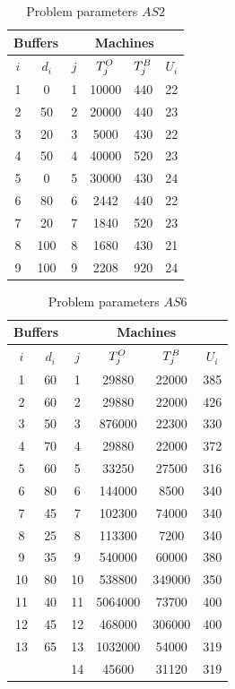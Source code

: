 \documentclass{ifacconf}
\begin{document}
\begin{table}[h!]
	\centering
	\small
	\begin{tabular}{||c|c||c|c|c|c||}
		\hline \hline
		\multicolumn{2}{||c||}{Buffers}&\multicolumn{4}{|c||}{Machines}\\
		\hline
		$i$ & $d_i$ & $j$  & $T^{\rm O}_j$ & $T^{\rm B}_j$ & $U_i$ \\
		\hline
		1 & 0   & 1  & 10000 & 440 & 22 \\
		2 & 50  & 2  & 20000 & 440 & 23 \\
		3 & 20  & 3  & 5000  & 430 & 22 \\
		4 & 50  & 4  & 40000 & 520 & 23 \\
		5 &  0  & 5  & 30000 & 430 & 24 \\
		6 & 80  & 6  & 2442  & 440 & 22 \\
		7 & 20  & 7  & 1840  & 520 & 23 \\
		8 & 100 & 8  & 1680  & 430 & 21 \\
		9 & 100 & 9  & 2208  & 920 & 24 \\
		\hline
	\end{tabular}
	\caption{Problem parameters $\textit{AS2}$} \label{tabl:as2}
\end{table}  
\begin{table}[h!]
	\centering
	\small
	\begin{tabular}{||c|c||c|c|c|c||}
		\hline \hline
		\multicolumn{2}{||c||}{Buffers}&\multicolumn{4}{|c||}{Machines}\\
		\hline
		$i$ & $d_i$ & $j$  & $T^{\rm O}_j$ & $T^{\rm B}_j$ & $U_i$ \\
		\hline
		1  & 60 & 1 & 29880 & 22000 &  385\\
		2  & 60 & 2 & 29880 & 22000 & 426\\
		3  & 50 & 3 & 876000 & 22300 & 330 \\
		4  & 70 & 4 & 29880 & 22000 & 372\\
		5  & 60 & 5 & 33250 & 27500 & 316 \\
		6  & 80 & 6 & 144000 & 8500 & 340 \\
		7  & 45 & 7 & 102300 & 74000 & 340 \\
		8  & 25 & 8 & 113300 & 7200 & 340 \\
		9  & 35 & 9 & 540000 &  60000 & 380 \\
		10 & 80 & 10 & 538800 & 349000 & 350 \\
		11 & 40 & 11 & 5064000 & 73700 & 400 \\
		12 & 45 & 12 & 468000 & 306000 & 400 \\
		13 & 65 & 13 & 1032000 & 54000 & 319 \\
		& & 14 & 45600 & 31120 & 319 \\
		\hline
	\end{tabular}
	\caption{Problem parameters $\textit{AS6}$} \label{tabl:as6}
\end{table}  
\end{document}
